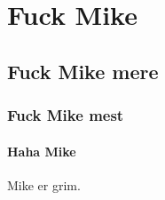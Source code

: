 \chapter{Fuck Mike}

\section*{Fuck Mike mere}

\subsection{Fuck Mike mest}

\subsubsection{Haha Mike}

\newpage



Mike er grim.